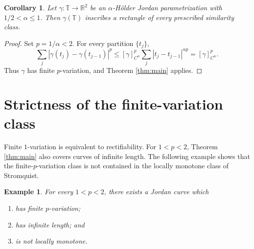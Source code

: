 \documentclass[11pt,reqno]{amsart}
\newtheorem{example}[theorem]{Example}
\newtheorem{corollary}[theorem]{Corollary}
\theoremstyle{definition}
\theoremstyle{remark}
\newcommand{\R}{\mathbb{R}}
\newcommand{\T}{\mathbb{T}}
\begin{document}
\begin{corollary}\label{cor:holder}
Let \(\gamma\colon\T\to\R^2\) be an \(\alpha\)-H\"older Jordan
parametrization with \(1/2<\alpha\leq1\).  Then \(\gamma(\T)\) inscribes a
rectangle of every prescribed similarity class.
\end{corollary}

\begin{proof}
Set \(p=1/\alpha<2\).  For every partition \(\{t_j\}\),
\[
 \sum_j|\gamma(t_j)-\gamma(t_{j-1})|^p
 \leq [\gamma]_{C^\alpha}^p
 \sum_j|t_j-t_{j-1}|^{\alpha p}
 = [\gamma]_{C^\alpha}^p.
\]
Thus \(\gamma\) has finite \(p\)-variation, and Theorem \ref{thm:main}
applies.
\end{proof}

\section{Strictness of the finite-variation class}

Finite \(1\)-variation is equivalent to rectifiability.  For
\(1<p<2\), Theorem \ref{thm:main} also covers curves of infinite length.  The
following example shows that the finite-\(p\)-variation class is not contained
in the locally monotone class of Stromquist.

\begin{example}\label{prop:spiral}
For every \(1<p<2\), there exists a Jordan curve which
\begin{enumerate}[label=\textup{(\roman*)}]
 \item has finite \(p\)-variation;
 \item has infinite length; and
 \item is not locally monotone.
\end{enumerate} 
\end{example}
\end{document}
